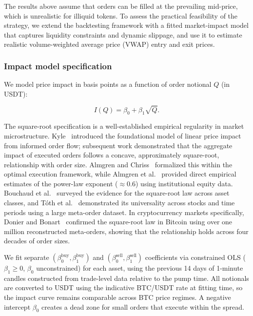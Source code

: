 \documentclass{ieeeaccess}
\begin{document}
The results above assume that orders can be filled at the prevailing mid-price, which is unrealistic for illiquid tokens. To assess the practical feasibility of the strategy, we extend the backtesting framework with a fitted market-impact model that captures liquidity constraints and dynamic slippage, and use it to estimate realistic volume-weighted average price (VWAP) entry and exit prices.

\subsubsection{Impact model specification}
We model price impact in basis points as a function of order notional $Q$ (in USDT):

\begin{equation}
    I(Q) = \beta_0 + \beta_1 \sqrt{Q}.
    \label{eq:impact_model}
\end{equation}

The square-root specification is a well-established empirical regularity in market microstructure. Kyle~\cite{kyle1985continuous} introduced the foundational model of linear price impact from informed order flow; subsequent work demonstrated that the aggregate impact of executed orders follows a concave, approximately square-root, relationship with order size. Almgren and Chriss~\cite{almgren2001optimal} formalized this within the optimal execution framework, while Almgren et al.~\cite{almgren2005direct} provided direct empirical estimates of the power-law exponent ($\approx 0.6$) using institutional equity data. Bouchaud et al.~\cite{bouchaud2009markets} surveyed the evidence for the square-root law across asset classes, and T\'{o}th et al.~\cite{toth2011anomalous} demonstrated its universality across stocks and time periods using a large meta-order dataset. In cryptocurrency markets specifically, Donier and Bonart~\cite{donier2015million} confirmed the square-root law in Bitcoin using over one million reconstructed meta-orders, showing that the relationship holds across four decades of order sizes.

We fit separate $(\beta_0^{\mathrm{buy}}, \beta_1^{\mathrm{buy}})$ and $(\beta_0^{\mathrm{sell}}, \beta_1^{\mathrm{sell}})$ coefficients via constrained OLS ($\beta_1 \geq 0$, $\beta_0$ unconstrained) for each asset, using the previous 14 days of 1-minute candles constructed from trade-level data relative to the pump time. All notionals are converted to USDT using the indicative BTC/USDT rate at fitting time, so the impact curve remains comparable across BTC price regimes. A negative intercept $\beta_0$ creates a dead zone for small orders that execute within the spread.
\end{document}
